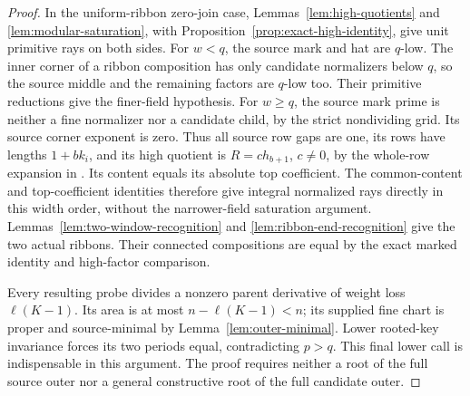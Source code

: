 \documentclass[11pt,a4paper]{amsart}
\numberwithin{equation}{section}
\theoremstyle{plain}
\theoremstyle{definition}
\begin{document}
\begin{proof}
In the uniform-ribbon zero-join case, Lemmas~\ref{lem:high-quotients} and \ref{lem:modular-saturation}, with Proposition~\ref{prop:exact-high-identity}, give unit primitive rays on both sides.  For \(w<q\), the source mark and hat are \(q\)-low.  The inner corner of a ribbon composition has only candidate normalizers below \(q\), so the source middle and the remaining factors are \(q\)-low too.  Their primitive reductions give the finer-field hypothesis.  For \(w\ge q\), the source mark prime is neither a fine normalizer nor a candidate child, by the strict nondividing grid.  Its source corner exponent is zero.  Thus all source row gaps are one, its rows have lengths \(1+bk_i\), and its high quotient is \(R=c h_{b+1}\), \(c\ne0\), by the whole-row expansion in .  Its content equals its absolute top coefficient.  The common-content and top-coefficient identities therefore give integral normalized rays directly in this width order, without the narrower-field saturation argument.  Lemmas~\ref{lem:two-window-recognition} and \ref{lem:ribbon-end-recognition} give the two actual ribbons.  Their connected compositions are equal by the exact marked identity and high-factor comparison.

Every resulting probe divides a nonzero parent derivative of weight loss \(\ell(K-1)\).  Its area is at most \(n-\ell(K-1)<n\); its supplied fine chart is proper and source-minimal by Lemma~\ref{lem:outer-minimal}.  Lower rooted-key invariance forces its two periods equal, contradicting \(p>q\).  This final lower call is indispensable in this argument.  The proof requires neither a root of the full source outer nor a general constructive root of the full candidate outer.
\end{proof}
\end{document}
